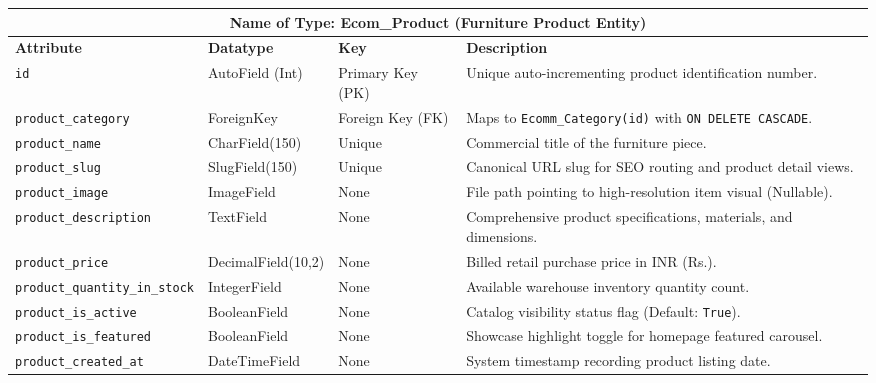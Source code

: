 \documentclass[12pt,a4paper]{article}
\begin{document}
{\begin{spacing}{1.15}
\begin{center}
\renewcommand{\arraystretch}{1.15}
\fontsize{9}{12}\selectfont
\begin{tabular}{|p{1.4in}|p{1.1in}|p{0.8in}|p{2.9in}|}
\hline
\multicolumn{4}{|c|}{\textbf{\fontsize{10}{13}\selectfont Name of Type: Ecom\_Product (Furniture Product Entity)}} \\ \hline
\textbf{Attribute} & \textbf{Datatype} & \textbf{Key} & \textbf{Description} \\ \hline
\texttt{id} & AutoField (Int) & Primary Key (PK) & Unique auto-incrementing product identification number. \\ \hline
\texttt{product\_category} & ForeignKey & Foreign Key (FK) & Maps to \texttt{Ecomm\_Category(id)} with \texttt{ON DELETE CASCADE}. \\ \hline
\texttt{product\_name} & CharField(150) & Unique & Commercial title of the furniture piece. \\ \hline
\texttt{product\_slug} & SlugField(150) & Unique & Canonical URL slug for SEO routing and product detail views. \\ \hline
\texttt{product\_image} & ImageField & None & File path pointing to high-resolution item visual (Nullable). \\ \hline
\texttt{product\_description} & TextField & None & Comprehensive product specifications, materials, and dimensions. \\ \hline
\texttt{product\_price} & DecimalField(10,2) & None & Billed retail purchase price in INR (Rs.). \\ \hline
\texttt{product\_quantity\_in\_stock} & IntegerField & None & Available warehouse inventory quantity count. \\ \hline
\texttt{product\_is\_active} & BooleanField & None & Catalog visibility status flag (Default: \texttt{True}). \\ \hline
\texttt{product\_is\_featured} & BooleanField & None & Showcase highlight toggle for homepage featured carousel. \\ \hline
\texttt{product\_created\_at} & DateTimeField & None & System timestamp recording product listing date. \\ \hline
\end{tabular}
\end{center}

\end{spacing}
}

\vfill

\newpage
\end{document}
